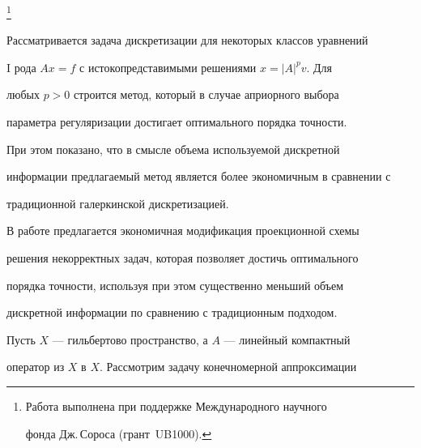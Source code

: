 \thanks{Работа выполнена при поддержке Международного научного 


фонда Дж.\,Сороса (грант \No\,UB1000).}


\date{}







\pagestyle{plain} %













\maketitle


\label{begin}





Рассматривается задача дискретизации для некоторых классов уравнений


I рода $Ax=f$  с истокопредставимыми решениями $x=|A|^p v$.  Для


любых $p>0$  строится метод, который в случае априорного выбора


параметра регуляризации достигает  оптимального  порядка  точности.


При этом показано, что в смысле объема используемой дискретной


информации предлагаемый метод является более экономичным в сравнении с


традиционной галеркинской дискретизацией.





В работе предлагается экономичная модификация проекционной схемы


решения некорректных задач, которая позволяет достичь оптимального


порядка точности, используя при этом существенно меньший объем


дискретной информации по сравнению с традиционным подходом.





Пусть $X$ --- гильбертово пространство, а $A$ ---  линейный  компактный


оператор из $X$ в $X$. Рассмотрим задачу конечномерной аппроксимации


